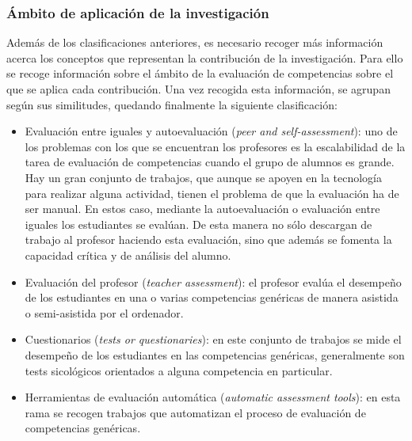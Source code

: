 \subsubsection{Ámbito de aplicación de la investigación}
Además de los clasificaciones anteriores, es necesario recoger más información acerca los conceptos que representan la contribución de la investigación. Para ello se recoge información sobre el ámbito de la evaluación de competencias sobre el que se aplica cada contribución. Una vez recogida esta información, se agrupan según sus similitudes, quedando finalmente la siguiente clasificación:
\begin{itemize}
\item Evaluación entre iguales y autoevaluación (\emph{peer and self-assessment}): uno de los problemas con los que se encuentran los profesores es la escalabilidad de la tarea de evaluación de competencias cuando el grupo de alumnos es grande. Hay un gran conjunto de trabajos, que aunque se apoyen en la tecnología para realizar alguna actividad, tienen el problema de que la evaluación ha de ser manual. En estos caso, mediante la autoevaluación o evaluación entre iguales los estudiantes se evalúan. De esta manera no sólo descargan de trabajo al profesor haciendo esta evaluación, sino que además se fomenta la capacidad crítica y de análisis del alumno.
\item Evaluación del profesor (\emph{teacher assessment}): el profesor evalúa el desempeño de los estudiantes en una o varias competencias genéricas de manera asistida o semi-asistida por el ordenador.
\item Cuestionarios (\emph{tests or questionaries}): en este conjunto de trabajos se mide el desempeño de los estudiantes en las competencias genéricas, generalmente son tests sicológicos orientados a alguna competencia en particular.
\item Herramientas de evaluación automática (\emph{automatic assessment tools}): en esta rama se recogen trabajos que automatizan el proceso de evaluación de competencias genéricas.


\end{itemize}
